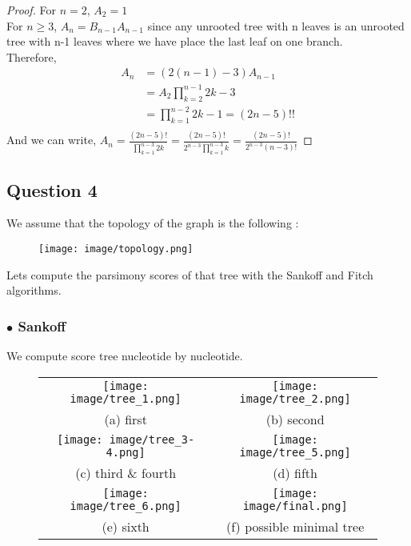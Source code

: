 \documentclass[]{article}
\theoremstyle{definition}
\begin{document}
\begin{proof}For $n=2$, $A_{2} = 1$\\
For $n\geq 3$, $A_{n} = B_{n-1}A_{n-1}$ since any unrooted tree with n leaves is an unrooted tree with n-1 leaves where we have place the last leaf on one branch.\\
Therefore, 
\begin{align*}
A_{n} &= (2(n-1)-3)A_{n-1}\\
&= A_{2}{\displaystyle{\prod_{k=2}^{n-1} 2k - 3}}\\
&= {\displaystyle \prod_{k=1}^{n-2} 2k - 1} = (2n-5)!!\\
\end{align*}
And we can write,
$
A_{n} = \frac{(2n - 5)!}{\displaystyle \prod_{k=1}^{n-3} 2k}
=  \frac{(2n - 5)!}{2^{n-3}\displaystyle \prod_{k=1}^{n-3}k}
= \frac{(2n - 5)!}{2^{n-3}(n-3)!}
$
\end{proof}
\newpage
\subsection{Question 4}
We assume that the topology of the graph is the following :

\begin{figure}[h!]
	\centering
	\texttt{[image: image/topology.png]}
\end{figure}

Lets compute the parsimony scores of that tree with the Sankoff and Fitch algorithms.

\subsubsection*{$\bullet$ Sankoff }
We compute score tree nucleotide by nucleotide.

\begin{figure}[h!]
	\centering
	\begin{tabular}{cc}
			\texttt{[image: image/tree\_1.png]} &   \texttt{[image: image/tree\_2.png]} \\
		(a) first & (b) second \\[6pt]
		\texttt{[image: image/tree\_3-4.png]} &   \texttt{[image: image/tree\_5.png]} \\
		(c) third \& fourth & (d) fifth \\[6pt]
		\texttt{[image: image/tree\_6.png]}&
		\texttt{[image: image/final.png]}\\
		(e) sixth & (f) possible minimal tree \\[6pt]
	\end{tabular}
\end{figure}
\end{document}
